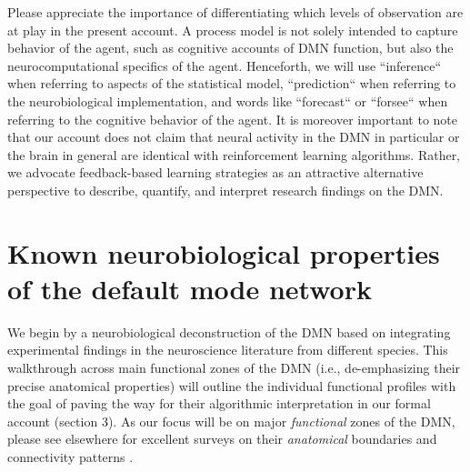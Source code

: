 \documentclass[10pt,letterpaper]{article}
\begin{document}
Please appreciate the importance of differentiating which levels of observation are at play in the present account. A process model is not solely intended to capture behavior of the agent, such as cognitive accounts of DMN function, but also the neurocomputational specifics of the agent. Henceforth, we will use ``inference`` when referring to aspects of the statistical model, ``prediction`` when referring to the neurobiological implementation, and words like ``forecast`` or ``forsee`` when referring to the
cognitive behavior of the agent.
%
It is moreover important to note that
our account does not claim that neural activity in the DMN in particular
or the brain in general are identical with reinforcement learning algorithms.
Rather, we advocate feedback-based learning strategies as an attractive alternative perspective
to describe, quantify, and interpret research findings on the DMN.



\section{Known neurobiological properties of the default mode network}
\label{sec:nodes}
We begin by a neurobiological deconstruction of the DMN
based on integrating experimental findings in the neuroscience literature
from different species.
This walkthrough across main functional zones of the DMN
(i.e., de-emphasizing their precise anatomical properties)
will outline the individual functional profiles with the goal of
paving the way for their algorithmic interpretation
in our formal account (section 3).
As our focus will be on major \textit{functional} zones of the DMN,
please see elsewhere for excellent surveys on their \textit{anatomical}
boundaries and connectivity patterns \citep{randy2008, binder2009, seghier2013angular}.
\end{document}
